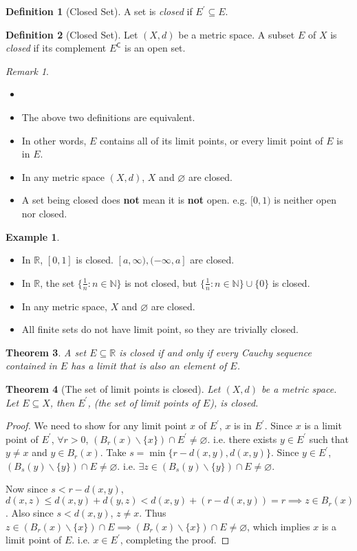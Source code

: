 \documentclass[12pt, lettersize]{book}
\theoremstyle{plain}
\newtheorem{thm}{Theorem}[section]
\theoremstyle{definition}
\newtheorem{dfn}[thm]{Definition}
\newtheorem*{eg}{Example}
\theoremstyle{remark}
\newtheorem*{rem}{Remark}
\newcommand{\R}{\mathbb{R}}
\newcommand{\N}{\mathbb{N}}
\newcommand{\com}{\mathsf{C}}
\let\emptyset\varnothing
\begin{document}
	\begin{dfn}[Closed Set]
		A set is \emph{closed} if $E^\prime\subseteq E$.
	\end{dfn}
	\begin{dfn}[Closed Set]
		Let $(X,d)$ be a metric space. A subset $E$ of $X$ is \emph{closed} if its complement $E^\com$ is an open set.
	\end{dfn}
	\begin{rem}
		\begin{itemize}
			\item[]
			\item The above two definitions are equivalent.
			\item In other words, $E$ contains all of its limit points, or every limit point of $E$ is in $E$.
			\item In any metric space $(X,d)$, $X$ and $\emptyset$ are closed.
			\item A set being closed does \textbf{not} mean it is \textbf{not} open. e.g. $[0,1)$ is neither open nor closed.
		\end{itemize}
	\end{rem}
	\begin{eg}
		\begin{itemize}
			\item In $\R$, $[0,1]$ is closed. $[a,\infty),(-\infty,a]$ are closed.
			\item In $\R$, the set $\{\frac{1}{n}: n\in\N\}$ is not closed, but $\{\frac{1}{n}: n\in\N\}\cup\{0\}$ is closed.
			\item In any metric space, $X$ and $\emptyset$ are closed.
			\item All finite sets do not have limit point, so they are trivially closed.
		\end{itemize}
	\end{eg}
	
	\begin{thm}
		A set $E\subseteq \R$ is closed if and only if every Cauchy sequence contained in $E$ has a limit that is also an element of $E$.
	\end{thm}
	
	\begin{thm}[The set of limit points is closed]
		Let $(X,d)$ be a metric space. Let $E\subseteq X$, then $E^\prime$, (the set of limit points of $E$), is closed.
	\end{thm}
	\begin{proof}
		We need to show for any limit point $x$ of $E^\prime$, $x$ is in $E^\prime$. Since $x$ is a limit point of $E^\prime$, $\forall r>0$, $(B_r(x)\backslash\{x\})\cap E^\prime\neq\emptyset$. i.e. there exists $y\in E^\prime$ such that $y\neq x$ and $y\in B_r(x)$. Take $s=\min\{r-d(x,y), d(x,y)\}$. Since $y\in E^\prime$, $(B_s(y)\backslash\{y\})\cap E\neq\emptyset$. i.e. $\exists z\in(B_s(y)\backslash\{y\})\cap E\neq\emptyset$.\smallskip
		
		Now since $s<r-d(x,y)$, $d(x,z)\leq d(x,y)+d(y,z)<d(x,y)+(r-d(x,y))=r\implies z\in B_r(x)$. Also since $s<d(x,y)$, $z\neq x$. Thus $z\in(B_r(x)\backslash\{x\})\cap E\implies (B_r(x)\backslash\{x\})\cap E\neq\emptyset$, which implies $x$ is a limit point of $E$. i.e. $x\in E^\prime$, completing the proof. 
	\end{proof}
	
\end{document}
